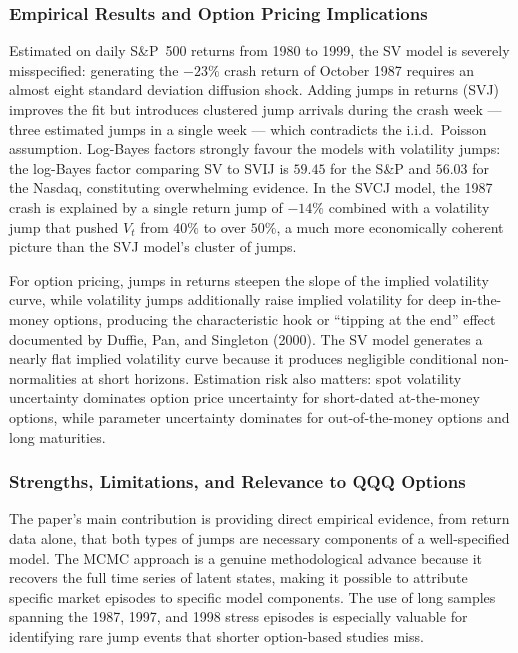 \documentclass[12pt]{article}
\begin{document}
\subsubsection*{Empirical Results and Option Pricing Implications}

Estimated on daily S\&P~500 returns from 1980 to 1999, the SV model is
severely misspecified: generating the $-23\%$ crash return of October 1987
requires an almost eight standard deviation diffusion shock. Adding jumps in
returns (SVJ) improves the fit but introduces clustered jump arrivals during the
crash week --- three estimated jumps in a single week --- which contradicts the
i.i.d.\ Poisson assumption. Log-Bayes factors strongly favour the models with
volatility jumps: the log-Bayes factor comparing SV to SVIJ is $59.45$ for the
S\&P and $56.03$ for the Nasdaq, constituting overwhelming evidence. In the
SVCJ model, the 1987 crash is explained by a single return jump of $-14\%$
combined with a volatility jump that pushed $V_t$ from $40\%$ to over $50\%$,
a much more economically coherent picture than the SVJ model's cluster of jumps.

For option pricing, jumps in returns steepen the slope of the implied volatility
curve, while volatility jumps additionally raise implied volatility for deep
in-the-money options, producing the characteristic hook or ``tipping at the end''
effect documented by Duffie, Pan, and Singleton (2000). The SV model generates
a nearly flat implied volatility curve because it produces negligible conditional
non-normalities at short horizons. Estimation risk also matters: spot volatility
uncertainty dominates option price uncertainty for short-dated at-the-money
options, while parameter uncertainty dominates for out-of-the-money options and
long maturities.

\subsubsection*{Strengths, Limitations, and Relevance to QQQ Options}

The paper's main contribution is providing direct empirical evidence, from
return data alone, that both types of jumps are necessary components of a
well-specified model. The MCMC approach is a genuine methodological advance
because it recovers the full time series of latent states, making it possible to
attribute specific market episodes to specific model components. The use of long
samples spanning the 1987, 1997, and 1998 stress episodes is especially valuable
for identifying rare jump events that shorter option-based studies miss.
\end{document}

